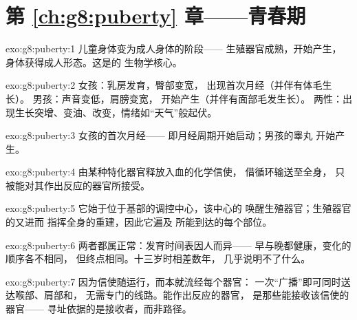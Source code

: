 \section*{第 \ref{ch:g8:puberty} 章——青春期}

\begin{solution}{exo:g8:puberty:1}
儿童身体变为成人身体的阶段——
生殖器官成熟，开始产生，
身体获得成人形态。这是的
生物学核心。
\end{solution}

\begin{solution}{exo:g8:puberty:2}
女孩：乳房发育，臀部变宽，
出现首次月经（并伴有体毛生长）。
男孩：声音变低，肩膀变宽，
开始产生（并伴有面部毛发生长）。
两性：出现生长突增、变油、改变，情绪如“天气”般起伏。
\end{solution}

\begin{solution}{exo:g8:puberty:3}
女孩的首次月经——
即月经周期开始启动；男孩的睾丸
开始产生。
\end{solution}

\begin{solution}{exo:g8:puberty:4}
由某种特化器官释放入血的化学信使，
借循环输送至全身，
只被能对其作出反应的器官所接受。
\end{solution}

\begin{solution}{exo:g8:puberty:5}
它始于位于基部的调控中心，该中心的
唤醒生殖器官；生殖器官的又进而
指挥全身的重建，因此它遍及
所能到达的每个部位。
\end{solution}

\begin{solution}{exo:g8:puberty:6}
两者都属正常：发育时间表因人而异——
早与晚都健康，变化的顺序各不相同，
但终点相同。十三岁时相差数年，
几乎说明不了什么。
\end{solution}

\begin{solution}{exo:g8:puberty:7}
因为信使随运行，而本就流经每个器官：
一次“广播”即可同时送达喉部、肩部和，
无需专门的线路。能作出反应的器官，
是那些能接收该信使的器官——
寻址依据的是接收者，而非路径。
\end{solution}

